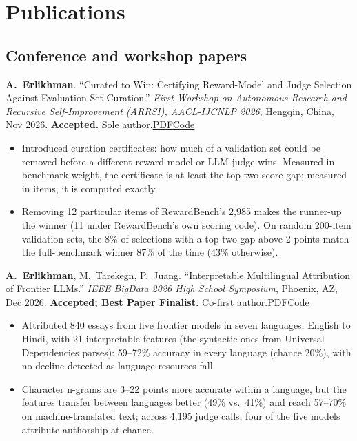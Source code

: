 \documentclass[letterpaper,11pt]{article}
\newcommand{\lnk}[2]{\href{#1}{\underline{#2}}}
\newcommand{\me}{\textbf{A.~Erlikhman}}
\begin{document}
\section{Publications}

\subsection{Conference and workshop papers}
\begin{pubs}
  \item \me. ``Curated to Win: Certifying Reward-Model and Judge Selection Against Evaluation-Set Curation.'' \textit{First Workshop on Autonomous Research and Recursive Self-Improvement (ARRSI), AACL-IJCNLP 2026}, Hengqin, China, Nov 2026. \textbf{Accepted.} Sole author.\enspace\lnk{https://adrianerlikhman.is-a.dev/papers/curated-to-win-arrsi2026.pdf}{PDF}\enspace\lnk{https://github.com/adrian-erlikhman/curated-to-win}{Code}
  \begin{itemize}
    \item Introduced curation certificates: how much of a validation set could be removed before a different reward model or LLM judge wins. Measured in benchmark weight, the certificate is at least the top-two score gap; measured in items, it is computed exactly.
    \item Removing 12 particular items of RewardBench's 2,985 makes the runner-up the winner (11 under RewardBench's own scoring code). On random 200-item validation sets, the 8\% of selections with a top-two gap above 2 points match the full-benchmark winner 87\% of the time (43\% otherwise).
  \end{itemize}
  \item \me, M.~Tarekegn, P.~Juang. ``Interpretable Multilingual Attribution of Frontier LLMs.'' \textit{IEEE BigData 2026 High School Symposium}, Phoenix, AZ, Dec 2026. \textbf{Accepted; Best Paper Finalist.} Co-first author.\enspace\lnk{https://adrianerlikhman.is-a.dev/papers/langllm-bigdata2026.pdf}{PDF}\enspace\lnk{https://github.com/adrian-erlikhman/LangLLM}{Code}
  \begin{itemize}
    \item Attributed 840 essays from five frontier models in seven languages, English to Hindi, with 21 interpretable features (the syntactic ones from Universal Dependencies parses): 59--72\% accuracy in every language (chance 20\%), with no decline detected as language resources fall.
    \item Character n-grams are 3--22 points more accurate within a language, but the features transfer between languages better (49\% vs.\ 41\%) and reach 57--70\% on machine-translated text; across 4,195 judge calls, four of the five models attribute authorship at chance.

\end{itemize}
\end{pubs}
\end{document}
